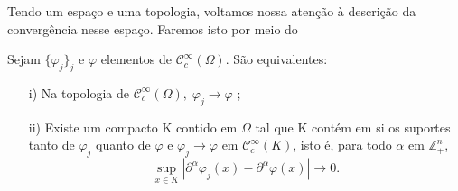 \documentclass[../distribution_theory_notes.tex]{subfiles}
\begin{document}
Tendo um espaço e uma topologia, voltamos nossa atenção à descrição da convergência nesse espaço. Faremos isto por meio do
\begin{theorem*}
	Sejam \(\{\varphi_{j}\}_{j}\) e \(\varphi \) elementos de \(\mathcal{C}_{c}^{\infty}(\Omega )\). São equivalentes:
	\begin{itemize}
		\item[i)] Na topologia de \(\mathcal{C}_{c}^{\infty}(\Omega ),\; \varphi_{j}\rightarrow \varphi \) ;
		\item[ii)] Existe um compacto K contido em \(\Omega \) tal que K contém em si os suportes tanto de \(\varphi_{j}\) quanto de \(\varphi \) e \(\varphi_{j}\rightarrow \varphi \) em \(\mathcal{C}_{c}^{\infty}(K)\), isto é, para todo \(\alpha \) em \(\mathbb{Z}_{+}^{n}\),
		      \[
			      \sup_{x\in K}|\partial^{\alpha }\varphi_{j}(x)-\partial^{\alpha }\varphi (x)|\rightarrow 0.
		      \]
	\end{itemize}
\end{theorem*}
\end{document}
